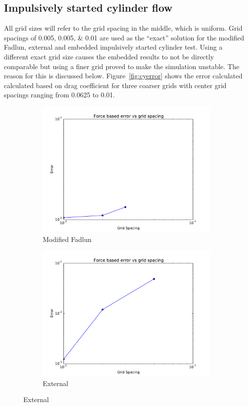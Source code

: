 \subsection{Impulsively started cylinder flow}
All grid sizes will refer to the grid spacing in the middle, which is uniform. 
Grid spacings of \numlist{0.005; 0.005; 0.01} are used as the ``exact'' solution for the modified Fadlun, external and embedded impulsively started cylinder test. 
Using a different exact grid size causes the embedded results to not be directly comparable but using a finer grid proved to make the simulation unstable. 
The reason for this is discussed below. 
Figure~\ref{fig:cyerror} shows the error calculated calculated based on drag coefficient for three coarser grids with center grid spacings ranging from 0.0625 to 0.01. 
\begin{figure}[H]
	\centering
	\begin{subfigure}{0.5\textwidth}
		\includegraphics[width=\linewidth]{error_fadlun}
		\caption{Modified Fadlun}
	\end{subfigure}
	
	\begin{subfigure}{0.5\textwidth}
		\includegraphics[width=\linewidth]{error_external}
		\caption{External}
	\end{subfigure}
	

\end{figure}
